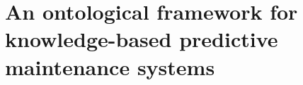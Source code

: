 
\chapter{An ontological framework for knowledge-based predictive maintenance systems}
\normalsize
\label{ch6}
	\minitoc

\clearpage